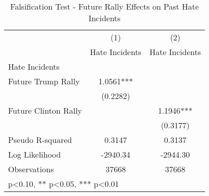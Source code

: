 \begin{table}[htbp]\centering
\def\sym#1{\ifmmode^{#1}\else\(^{#1}\)\fi}
\caption{Falsification Test - Future Rally Effects on Past Hate Incidents}
\begin{tabular}{l*{2}{c}}
\hline\hline
                    &\multicolumn{1}{c}{(1)}   &\multicolumn{1}{c}{(2)}   \\
                    &Hate Incidents   &Hate Incidents   \\
\hline
Hate Incidents      &               &               \\
Future Trump Rally  &      1.0561***&               \\
                    &    (0.2282)   &               \\
Future Clinton Rally&               &      1.1946***\\
                    &               &    (0.3177)   \\
\hline
Pseudo R-squared    &      0.3147   &      0.3137   \\
Log Likelihood      &    -2940.34   &    -2944.30   \\
Observations        &       37668   &       37668   \\
\hline\hline
\multicolumn{3}{l}{\footnotesize * p<0.10, ** p<0.05, *** p<0.01}\\
\end{tabular}
\end{table}
